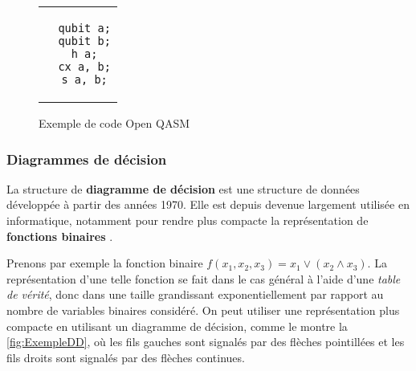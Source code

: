 \begin{figure}[thp]
  \renewcommand{\figurename}{Programme}
  \centering
\begin{tabular}{c}
\begin{lstlisting}
  qubit a;
  qubit b;
  h a;
  cx a, b;
  s a, b;
\end{lstlisting}
\end{tabular}
\caption{Exemple de code Open QASM}
\label{lst:QASM}
\end{figure}

\subsubsection*{Diagrammes de décision}

La structure de \textbf{diagramme de décision} est une structure de données développée à partir des années 1970. Elle est depuis devenue largement utilisée en informatique, notamment pour rendre plus compacte la représentation de \textbf{fonctions binaires} \cite{Minato_1996}.

Prenons par exemple la fonction binaire $f(x_1, x_2, x_3) = x_1 \lor (x_2 \land x_3)$. La représentation d'une telle fonction se fait dans le cas général à l'aide d'une \textit{table de vérité}, donc dans une taille grandissant exponentiellement par rapport au nombre de variables binaires considéré. On peut utiliser une représentation plus compacte en utilisant un diagramme de décision, comme le montre la \autoref{fig:ExempleDD}, où les fils gauches sont signalés par des flèches pointillées et les fils droits sont signalés par des flèches continues.

